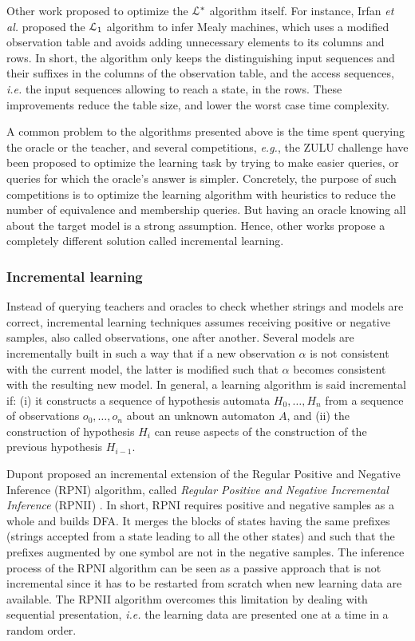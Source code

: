Other work proposed to optimize the $\EuScript{L}^*$ algorithm
itself. For instance, Irfan \emph{et al.} proposed the $\EuScript{L}_1$
algorithm \cite{irfan12} to infer Mealy machines, which uses a
modified observation table and avoids adding unnecessary elements
to its columns and rows. In short, the algorithm only keeps the
distinguishing input sequences and their suffixes in the columns
of the observation table, and the access sequences, \emph{i.e.} the
input sequences allowing to reach a state, in the rows. These
improvements reduce the table size, and lower the worst case time
complexity.

A common problem to the algorithms presented above is the time
spent querying the oracle or the teacher, and several
competitions, \emph{e.g.}, the ZULU challenge \cite{zulu} have been
proposed to optimize the learning task by trying to make easier
queries, or queries for which the oracle's answer is simpler.
Concretely, the purpose of such competitions is to optimize the
learning algorithm with heuristics to reduce the number of
equivalence and membership queries. But having an oracle knowing
all about the target model is a strong assumption. Hence, other
works propose a completely different solution called incremental
learning.

\subsubsection{Incremental learning}
\label{sec:active-increment}

Instead of querying teachers and oracles to check whether strings
and models are correct, incremental learning techniques assumes
receiving positive or negative samples, also called observations,
one after another.  Several models are incrementally built in
such a way that if a new observation $\alpha$ is not consistent
with the current model, the latter is modified such that $\alpha$
becomes consistent with the resulting new model.  In general, a
learning algorithm is said incremental if: (i) it constructs a
sequence of hypothesis automata $H_0, \dots, H_n$ from a sequence
of observations $o_0, \dots, o_n$  about an unknown automaton
$A$, and (ii) the construction of hypothesis $H_i$ can reuse
aspects of the construction of the previous hypothesis $H_{i-1}$.

Dupont proposed an incremental extension of the Regular Positive
and Negative Inference (RPNI) algorithm, called \textit{Regular
Positive and Negative Incremental Inference} (RPNII)
\cite{Dupont96incrementalregular}. In short, RPNI requires
positive and negative samples as a whole and builds DFA. It
merges the blocks of states having the same prefixes (strings
accepted from a state leading to all the other states) and such
that the prefixes augmented by one symbol are not in the negative
samples. The inference process of the RPNI algorithm can be seen
as a passive approach that is not incremental since it has to
be restarted from scratch when new learning data are available.
The RPNII algorithm overcomes this limitation by dealing with
sequential presentation, \emph{i.e.} the learning data are presented one
at a time in a random order.

